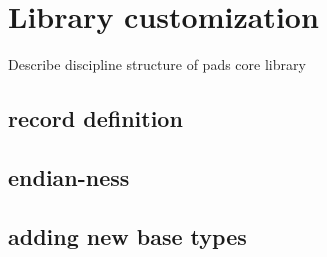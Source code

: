 \chapter{Library customization}
Describe discipline structure of pads core library
\section{record definition}
\section{endian-ness}
\section{adding new base types}
